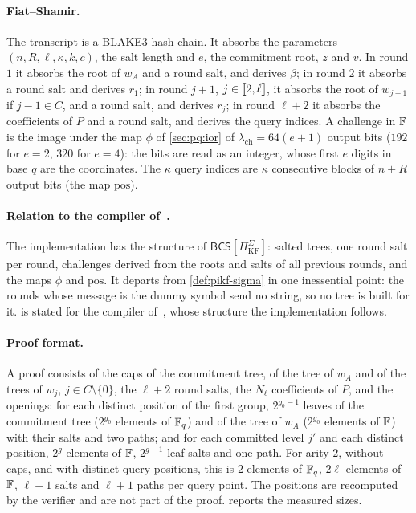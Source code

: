 \paragraph{Fiat--Shamir.}
The transcript is a BLAKE3 hash chain. It absorbs the parameters $(n, R, \ell, \kappa, k, c)$, the salt length and $e$, the commitment root, $z$ and $v$.
In round $1$ it absorbs the root of $w_A$ and a round salt, and derives $\beta$; in round $2$ it absorbs a round salt and derives $r_1$; in round $j+1$, $j \in \llbracket 2, \ell \rrbracket$, it absorbs the root of $w_{j-1}$ if $j - 1 \in C$, and a round salt, and derives $r_j$; in round $\ell+2$ it absorbs the coefficients of $P$ and a round salt, and derives the query indices.
A challenge in $\mathbb{F}$ is the image under the map $\phi$ of \cref{sec:pq:ior} of $\lambda_{\mathrm{ch}} = 64(e+1)$ output bits ($192$ for $e = 2$, $320$ for $e = 4$): the bits are read as an integer, whose first $e$ digits in base $q$ are the coordinates.
The $\kappa$ query indices are $\kappa$ consecutive blocks of $n+R$ output bits (the map $\mathrm{pos}$).

\paragraph{Relation to the compiler of~\cite{CDHZ25}.}
The implementation has the structure of $\mathsf{BCS}[\Pi^\Sigma_{\mathrm{KF}}]$: salted trees, one round salt per round, challenges derived from the roots and salts of all previous rounds, and the maps $\phi$ and $\mathrm{pos}$.
It departs from \cref{def:pikf-sigma} in one inessential point: the rounds whose message is the dummy symbol send no string, so no tree is built for it.
 is stated for the compiler of~\cite[Construction~11.7]{CDHZ25}, whose structure the implementation follows.

\paragraph{Proof format.}
A proof consists of the caps of the commitment tree, of the tree of $w_A$ and of the trees of $w_{j}$, $j \in C \setminus \{0\}$, the $\ell + 2$ round salts, the $N_\ell$ coefficients of $P$, and the openings: for each distinct position of the first group, $2^{g_0-1}$ leaves of the commitment tree ($2^{g_0}$ elements of $\mathbb{F}_q$) and of the tree of $w_A$ ($2^{g_0}$ elements of $\mathbb{F}$) with their salts and two paths; and for each committed level $j'$ and each distinct position, $2^{g}$ elements of $\mathbb{F}$, $2^{g-1}$ leaf salts and one path.
For arity $2$, without caps, and with distinct query positions, this is $2$ elements of $\mathbb{F}_q$, $2\ell$ elements of $\mathbb{F}$, $\ell + 1$ salts and $\ell + 1$ paths per query point.
The positions are recomputed by the verifier and are not part of the proof.
 reports the measured sizes.

